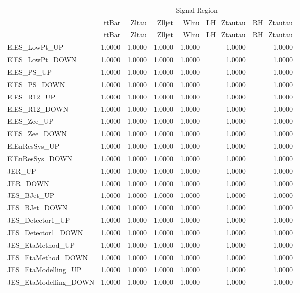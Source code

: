 \documentclass[11pt,oneside,a4paper]{article}
\begin{document}
\centering
\begin{table}
\centering
\begin{tabular}{lrrrrrr}
 & \multicolumn{6}{c}{Signal Region} \\
 & ttBar & Zltau & Zlljet & Wlnu & LH\_Ztautau & RH\_Ztautau \\
 & ttBar & Zltau & Zlljet & Wlnu & LH\_Ztautau & RH\_Ztautau \\
ElES\_LowPt\_UP & 1.0000 & 1.0000 & 1.0000 & 1.0000 & 1.0000 & 1.0000 \\
ElES\_LowPt\_DOWN & 1.0000 & 1.0000 & 1.0000 & 1.0000 & 1.0000 & 1.0000 \\
ElES\_PS\_UP & 1.0000 & 1.0000 & 1.0000 & 1.0000 & 1.0000 & 1.0000 \\
ElES\_PS\_DOWN & 1.0000 & 1.0000 & 1.0000 & 1.0000 & 1.0000 & 1.0000 \\
ElES\_R12\_UP & 1.0000 & 1.0000 & 1.0000 & 1.0000 & 1.0000 & 1.0000 \\
ElES\_R12\_DOWN & 1.0000 & 1.0000 & 1.0000 & 1.0000 & 1.0000 & 1.0000 \\
ElES\_Zee\_UP & 1.0000 & 1.0000 & 1.0000 & 1.0000 & 1.0000 & 1.0000 \\
ElES\_Zee\_DOWN & 1.0000 & 1.0000 & 1.0000 & 1.0000 & 1.0000 & 1.0000 \\
ElEnResSys\_UP & 1.0000 & 1.0000 & 1.0000 & 1.0000 & 1.0000 & 1.0000 \\
ElEnResSys\_DOWN & 1.0000 & 1.0000 & 1.0000 & 1.0000 & 1.0000 & 1.0000 \\
JER\_UP & 1.0000 & 1.0000 & 1.0000 & 1.0000 & 1.0000 & 1.0000 \\
JER\_DOWN & 1.0000 & 1.0000 & 1.0000 & 1.0000 & 1.0000 & 1.0000 \\
JES\_BJet\_UP & 1.0000 & 1.0000 & 1.0000 & 1.0000 & 1.0000 & 1.0000 \\
JES\_BJet\_DOWN & 1.0000 & 1.0000 & 1.0000 & 1.0000 & 1.0000 & 1.0000 \\
JES\_Detector1\_UP & 1.0000 & 1.0000 & 1.0000 & 1.0000 & 1.0000 & 1.0000 \\
JES\_Detector1\_DOWN & 1.0000 & 1.0000 & 1.0000 & 1.0000 & 1.0000 & 1.0000 \\
JES\_EtaMethod\_UP & 1.0000 & 1.0000 & 1.0000 & 1.0000 & 1.0000 & 1.0000 \\
JES\_EtaMethod\_DOWN & 1.0000 & 1.0000 & 1.0000 & 1.0000 & 1.0000 & 1.0000 \\
JES\_EtaModelling\_UP & 1.0000 & 1.0000 & 1.0000 & 1.0000 & 1.0000 & 1.0000 \\
JES\_EtaModelling\_DOWN & 1.0000 & 1.0000 & 1.0000 & 1.0000 & 1.0000 & 1.0000 \\

\end{tabular}
\end{table}
\end{document}
